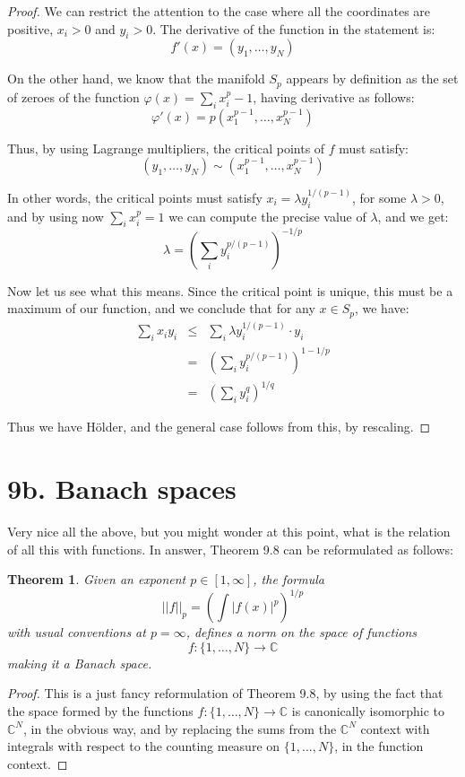 \documentclass[12pt]{amsbook}
\newtheorem{theorem}{Theorem}[chapter]
\begin{document}
\begin{proof}
We can restrict the attention to the case where all the coordinates are positive, $x_i>0$ and  $y_i>0$. The derivative of the function in the statement is:
$$f'(x)=(y_1,\ldots,y_N)$$

On the other hand, we know that the manifold $S_p$ appears by definition as the set of zeroes of the function $\varphi(x)=\sum_ix_i^p-1$, having derivative as follows:
$$\varphi'(x)=p(x_1^{p-1},\ldots,x_N^{p-1})$$

Thus, by using Lagrange multipliers, the critical points of $f$ must satisfy:
$$(y_1,\ldots,y_N)\sim(x_1^{p-1},\ldots,x_N^{p-1})$$

In other words, the critical points must satisfy $x_i=\lambda y_i^{1/(p-1)}$, for some $\lambda>0$, and by using now $\sum_ix_i^p=1$ we can compute the precise value of $\lambda$, and we get:
$$\lambda=\left(\sum_iy_i^{p/(p-1)}\right)^{-1/p}$$ 

Now let us see what this means. Since the critical point is unique, this must be a maximum of our function, and we conclude that for any $x\in S_p$, we have:
\begin{eqnarray*}
\sum_ix_iy_i
&\leq&\sum_i\lambda y_i^{1/(p-1)}\cdot y_i\\
&=&\left(\sum_iy_i^{p/(p-1)}\right)^{1-1/p}\\
&=&\left(\sum_iy_i^q\right)^{1/q}
\end{eqnarray*}

Thus we have H\"older, and the general case follows from this, by rescaling.
\end{proof}

\section*{9b. Banach spaces}

Very nice all the above, but you might wonder at this point, what is the relation of all this with functions. In answer, Theorem 9.8 can be reformulated as follows:

\begin{theorem}
Given an exponent $p\in[1,\infty]$, the formula
$$||f||_p=\left(\int|f(x)|^p\right)^{1/p}$$
with usual conventions at $p=\infty$, defines a norm on the space of functions 
$$f:\{1,\ldots,N\}\to\mathbb C$$
making it a Banach space.
\end{theorem}

\begin{proof}
This is a just fancy reformulation of Theorem 9.8, by using the fact that the space formed by the functions $f:\{1,\ldots,N\}\to\mathbb C$ is canonically isomorphic to $\mathbb C^N$, in the obvious way, and by replacing the sums from the $\mathbb C^N$ context with integrals with respect to the counting measure on $\{1,\ldots,N\}$, in the function context.
\end{proof}
\end{document}
